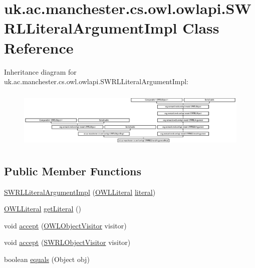 \hypertarget{classuk_1_1ac_1_1manchester_1_1cs_1_1owl_1_1owlapi_1_1_s_w_r_l_literal_argument_impl}{\section{uk.\-ac.\-manchester.\-cs.\-owl.\-owlapi.\-S\-W\-R\-L\-Literal\-Argument\-Impl Class Reference}
\label{classuk_1_1ac_1_1manchester_1_1cs_1_1owl_1_1owlapi_1_1_s_w_r_l_literal_argument_impl}
}
Inheritance diagram for uk.\-ac.\-manchester.\-cs.\-owl.\-owlapi.\-S\-W\-R\-L\-Literal\-Argument\-Impl\-:\begin{figure}[H]
\begin{center}
\leavevmode
\includegraphics[height=2.808023cm]{classuk_1_1ac_1_1manchester_1_1cs_1_1owl_1_1owlapi_1_1_s_w_r_l_literal_argument_impl}
\end{center}
\end{figure}
\subsection*{Public Member Functions}
\begin{DoxyCompactItemize}
\item 
\hyperlink{classuk_1_1ac_1_1manchester_1_1cs_1_1owl_1_1owlapi_1_1_s_w_r_l_literal_argument_impl_a23572caa156c53a51f451c01965e7ff3}{S\-W\-R\-L\-Literal\-Argument\-Impl} (\hyperlink{interfaceorg_1_1semanticweb_1_1owlapi_1_1model_1_1_o_w_l_literal}{O\-W\-L\-Literal} \hyperlink{classuk_1_1ac_1_1manchester_1_1cs_1_1owl_1_1owlapi_1_1_s_w_r_l_literal_argument_impl_abb5feeffba3b08ef31fcd4bfc45caab0}{literal})
\item 
\hyperlink{interfaceorg_1_1semanticweb_1_1owlapi_1_1model_1_1_o_w_l_literal}{O\-W\-L\-Literal} \hyperlink{classuk_1_1ac_1_1manchester_1_1cs_1_1owl_1_1owlapi_1_1_s_w_r_l_literal_argument_impl_a21689e551d2ca8c92aa57fb3550f7fa2}{get\-Literal} ()
\item 
void \hyperlink{classuk_1_1ac_1_1manchester_1_1cs_1_1owl_1_1owlapi_1_1_s_w_r_l_literal_argument_impl_a4359f9436fd5ae355624a19fe8e6ee1b}{accept} (\hyperlink{interfaceorg_1_1semanticweb_1_1owlapi_1_1model_1_1_o_w_l_object_visitor}{O\-W\-L\-Object\-Visitor} visitor)
\item 
void \hyperlink{classuk_1_1ac_1_1manchester_1_1cs_1_1owl_1_1owlapi_1_1_s_w_r_l_literal_argument_impl_ae45f66260d7a04f71f8e3eeaf41ba9f2}{accept} (\hyperlink{interfaceorg_1_1semanticweb_1_1owlapi_1_1model_1_1_s_w_r_l_object_visitor}{S\-W\-R\-L\-Object\-Visitor} visitor)
\item 
boolean \hyperlink{classuk_1_1ac_1_1manchester_1_1cs_1_1owl_1_1owlapi_1_1_s_w_r_l_literal_argument_impl_a54752391e5da3174422423995b229450}{equals} (Object obj)
\end{DoxyCompactItemize}
